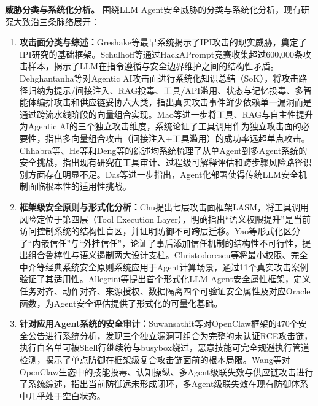\textbf{威胁分类与系统化分析。}
围绕LLM Agent安全威胁的分类与系统化分析，现有研究大致沿三条脉络展开：
\begin{enumerate}
  \item \textbf{攻击面分类与综述：}Greshake等\cite{greshake2023notwhat3}最早系统揭示了IPI攻击的现实威胁，奠定了IPI研究的基础框架。Schulhoff等\cite{schulhoff2023ignore}通过HackAPrompt竞赛收集超过600,000条攻击样本，揭示了LLM在指令遵循与安全边界维护之间的结构性矛盾。Dehghantanha等\cite{dehghantanha2026sokattacksurfaceagentic}对Agentic AI攻击面进行系统化知识总结（SoK），将攻击路径归纳为提示/间接注入、RAG投毒、工具/API滥用、状态与记忆投毒、多智能体编排攻击和供应链妥协六大类，指出真实攻击事件鲜少依赖单一漏洞而是通过跨流水线阶段的向量组合实现。Mao等\cite{mao2026sok}进一步将工具、RAG与自主性提升为Agentic AI的三个独立攻击维度，系统论证了工具调用作为独立攻击面的必要性，指出多向量组合攻击（间接注入+工具滥用）的成功率远超单点攻击。Chhabra等\cite{chhabra2025agentic}、He等\cite{he2025survey}和Deng等\cite{deng2025agentsunderthreat}的综述均系统梳理了从单Agent到多Agent系统的安全挑战，指出现有研究在工具审计、过程级可解释评估和跨步骤风险路径识别方面存在明显不足。Das等\cite{das2025security}进一步指出，Agent化部署使得传统LLM安全机制面临根本性的适用性挑战。
  \item \textbf{框架级安全原则与形式化分析：}Chu\cite{chu2026systematic}提出七层攻击面框架LASM，将工具调用风险定位于第四层（Tool Execution Layer），明确指出“语义权限提升”是当前访问控制系统的结构性盲区，并证明防御不可跨层迁移。Yao等\cite{yao2026trustworthy}形式化区分了“内嵌信任”与“外挂信任”，论证了事后添加信任机制的结构性不可行性，提出组合鲁棒性与语义遏制两大设计支柱。Christodorescu等\cite{christodorescu2025systems}将最小权限、完全中介等经典系统安全原则系统应用于Agent计算场景，通过11个真实攻击案例验证了其适用性。Allegrini等\cite{allegrini2025formalizing}提出首个形式化LLM Agent安全属性框架，定义任务对齐、动作对齐、来源授权、数据隔离四个可验证安全属性及对应Oracle函数，为Agent安全评估提供了形式化的可量化基础。
  \item \textbf{针对应用Agent系统的安全审计：}Suwansathit等\cite{suwansathit2026security}对OpenClaw框架的470个安全公告进行系统分析，发现三个独立漏洞可组合为完整的未认证RCE攻击链，执行白名单可被Shell行继续符与busybox绕过，恶意技能可完全规避执行管道检测，揭示了单点防御在框架级复合攻击链面前的根本局限。Wang等\cite{wang2026security}对OpenClaw生态中的技能投毒、认知操纵、多Agent级联失效与供应链攻击进行了系统综述，指出当前防御远未形成闭环，多Agent级联失效在现有防御体系中几乎处于空白状态。
\end{enumerate}

